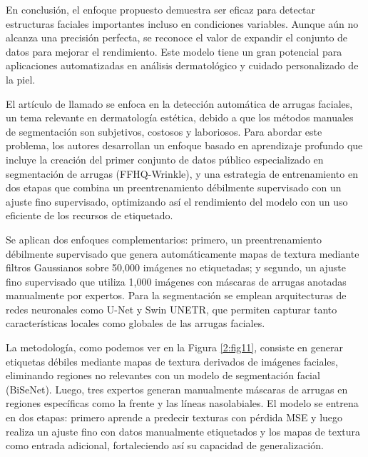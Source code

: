 En conclusión, el enfoque propuesto demuestra ser eficaz para detectar estructuras faciales importantes incluso en condiciones variables. Aunque aún no alcanza una precisión perfecta, se reconoce el valor de expandir el conjunto de datos para mejorar el rendimiento. Este modelo tiene un gran potencial para aplicaciones automatizadas en análisis dermatológico y cuidado personalizado de la piel.

El artículo de \cite{moon2024dermatology} llamado  se enfoca en la detección automática de arrugas faciales, un tema relevante en dermatología estética, debido a que los métodos manuales de segmentación son subjetivos, costosos y laboriosos. Para abordar este problema, los autores desarrollan un enfoque basado en aprendizaje profundo que incluye la creación del primer conjunto de datos público especializado en segmentación de arrugas (FFHQ-Wrinkle), y una estrategia de entrenamiento en dos etapas que combina un preentrenamiento débilmente supervisado con un ajuste fino supervisado, optimizando así el rendimiento del modelo con un uso eficiente de los recursos de etiquetado.

Se aplican dos enfoques complementarios: primero, un preentrenamiento débilmente supervisado que genera automáticamente mapas de textura mediante filtros Gaussianos sobre 50,000 imágenes no etiquetadas; y segundo, un ajuste fino supervisado que utiliza 1,000 imágenes con máscaras de arrugas anotadas manualmente por expertos. Para la segmentación se emplean arquitecturas de redes neuronales como U-Net y Swin UNETR, que permiten capturar tanto características locales como globales de las arrugas faciales.

La metodología, como podemos ver en la Figura \ref{2:fig11}, consiste en generar etiquetas débiles mediante mapas de textura derivados de imágenes faciales, eliminando regiones no relevantes con un modelo de segmentación facial (BiSeNet). Luego, tres expertos generan manualmente máscaras de arrugas en regiones específicas como la frente y las líneas nasolabiales. El modelo se entrena en dos etapas: primero aprende a predecir texturas con pérdida MSE y luego realiza un ajuste fino con datos manualmente etiquetados y los mapas de textura como entrada adicional, fortaleciendo así su capacidad de generalización.


